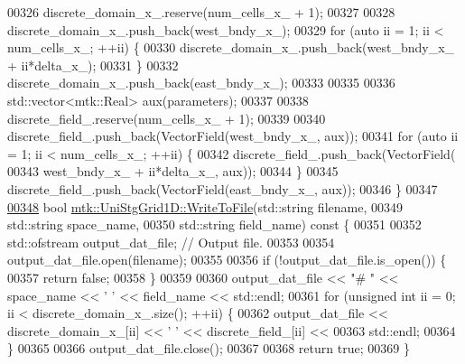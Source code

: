 \begin{DoxyCode}
00326   discrete\_domain\_x\_.reserve(num\_cells\_x\_ + 1);
00327 
00328   discrete\_domain\_x\_.push\_back(west\_bndy\_x\_);
00329   \textcolor{keywordflow}{for} (\textcolor{keyword}{auto} ii = 1; ii < num\_cells\_x\_; ++ii) \{
00330     discrete\_domain\_x\_.push\_back(west\_bndy\_x\_ + ii*delta\_x\_);
00331   \}
00332   discrete\_domain\_x\_.push\_back(east\_bndy\_x\_);
00333 
00335 
00336   std::vector<mtk::Real> aux(parameters);
00337 
00338   discrete\_field\_.reserve(num\_cells\_x\_ + 1);
00339 
00340   discrete\_field\_.push\_back(VectorField(west\_bndy\_x\_, aux));
00341   \textcolor{keywordflow}{for} (\textcolor{keyword}{auto} ii = 1; ii < num\_cells\_x\_; ++ii) \{
00342     discrete\_field\_.push\_back(VectorField(
00343       west\_bndy\_x\_ + ii*delta\_x\_, aux));
00344   \}
00345   discrete\_field\_.push\_back(VectorField(east\_bndy\_x\_, aux));
00346 \}
00347 
\hypertarget{mtk__uni__stg__grid__1d_8cc_source_l00348}{}\hyperlink{classmtk_1_1UniStgGrid1D_a6d2c10aa9468a037829f0eb043b898dc}{00348} \textcolor{keywordtype}{bool} \hyperlink{classmtk_1_1UniStgGrid1D_a6d2c10aa9468a037829f0eb043b898dc}{mtk::UniStgGrid1D::WriteToFile}(std::string filename,
00349                                     std::string space\_name,
00350                                     std::string field\_name)\textcolor{keyword}{ const }\{
00351 
00352   std::ofstream output\_dat\_file;  \textcolor{comment}{// Output file.}
00353 
00354   output\_dat\_file.open(filename);
00355 
00356   \textcolor{keywordflow}{if} (!output\_dat\_file.is\_open()) \{
00357     \textcolor{keywordflow}{return} \textcolor{keyword}{false};
00358   \}
00359 
00360   output\_dat\_file << \textcolor{stringliteral}{"# "} << space\_name <<  \textcolor{charliteral}{' '} << field\_name << std::endl;
00361   \textcolor{keywordflow}{for} (\textcolor{keywordtype}{unsigned} \textcolor{keywordtype}{int} ii = 0; ii < discrete\_domain\_x\_.size(); ++ii) \{
00362     output\_dat\_file << discrete\_domain\_x\_[ii] << \textcolor{charliteral}{' '} << discrete\_field\_[ii] <<
00363       std::endl;
00364   \}
00365 
00366   output\_dat\_file.close();
00367 
00368   \textcolor{keywordflow}{return} \textcolor{keyword}{true};
00369 \}
\end{DoxyCode}
